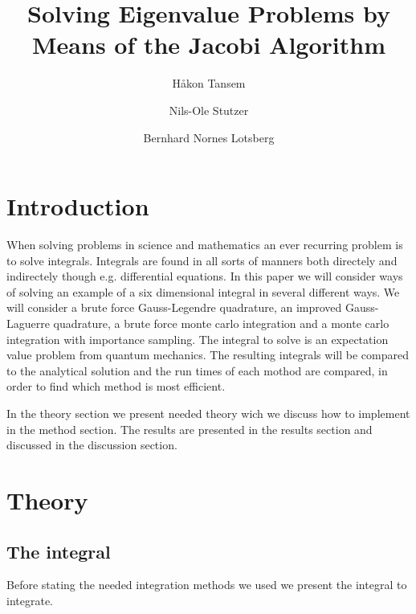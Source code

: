 \documentclass[twocolumn]{aastex62}
\begin{document}
\title{Solving Eigenvalue Problems by Means of the Jacobi Algorithm}

\author{Håkon Tansem}

\author{Nils-Ole Stutzer}

\author{Bernhard Nornes Lotsberg}

\begin{abstract}
\end{abstract}

\section{Introduction} \label{sec:intro}
When solving problems in science and mathematics an ever recurring problem is to solve integrals. Integrals are found in all sorts of manners both directely and indirectely though e.g. differential equations. In this paper we will consider ways of solving an example of a six dimensional integral in several different ways. We will consider a brute force Gauss-Legendre quadrature, an improved Gauss-Laguerre quadrature, a brute force monte carlo integration and a monte carlo integration with importance sampling. The integral to solve is an expectation value problem from quantum mechanics. The resulting integrals will be compared to the analytical solution and the run times of each mothod are compared, in order to find which method is most efficient.

In the theory section we present needed theory wich we discuss how to implement in the method section. The results are presented in the results section and discussed in the discussion section.

\section{Theory} \label{sec:theory}
\subsection{The integral}
Before stating the needed integration methods we used we present the integral to integrate.
\end{document}

